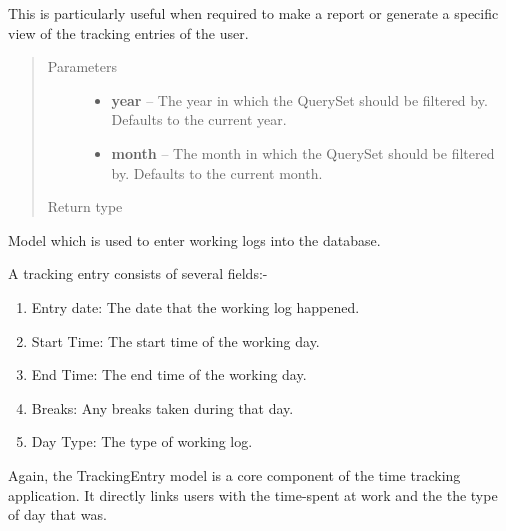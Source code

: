 \documentclass[letterpaper,10pt,english]{sphinxmanual}
\begin{document}
\begin{fulllineitems}
\begin{fulllineitems}
This is particularly useful when required to make a report or generate
a specific view of the tracking entries of the user.
\begin{quote}\begin{description}
\item[{Parameters}] \leavevmode\begin{itemize}
\item {} 
\textbf{year} -- The year in which the QuerySet should be filtered
by. Defaults to the current year.

\item {} 
\textbf{month} -- The month in which the QuerySet should be filtered
by. Defaults to the current month.

\end{itemize}

\item[{Return type}] \leavevmode
{}

\end{description}\end{quote}

\end{fulllineitems}


\end{fulllineitems}


\begin{fulllineitems}
\label{timetracker:timetracker.tracker.models.TrackingEntry}
Model which is used to enter working logs into the database.

A tracking entry consists of several fields:-
\begin{enumerate}
\item {} 
Entry date: The date that the working log happened.

\item {} 
Start Time: The start time of the working day.

\item {} 
End Time: The end time of the working day.

\item {} 
Breaks: Any breaks taken during that day.

\item {} 
Day Type: The type of working log.

\end{enumerate}

Again, the TrackingEntry model is a core component of the time tracking
application. It directly links users with the time-spent at work and the
the type of day that was.

\end{fulllineitems}
\end{document}

